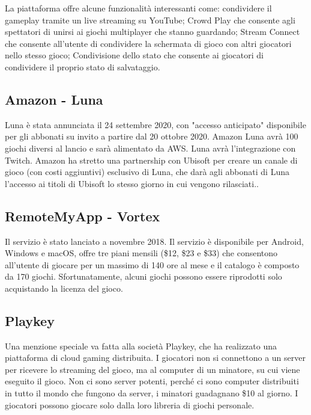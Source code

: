 La piattaforma offre alcune funzionalità interessanti come: condividere il gameplay tramite un live streaming su YouTube; Crowd Play che consente agli spettatori di unirsi ai giochi multiplayer che stanno guardando; Stream Connect che consente all'utente di condividere la schermata di gioco con altri giocatori nello stesso gioco; Condivisione dello stato che consente ai giocatori di condividere il proprio stato di salvataggio\cite{Google_Stadia}.

\subsection{Amazon - Luna}
Luna è stata annunciata il 24 settembre 2020, con "accesso anticipato" disponibile per gli abbonati su invito a partire dal 20 ottobre 2020. Amazon Luna avrà 100 giochi diversi al lancio e sarà alimentato da AWS. Luna avrà l'integrazione con Twitch. Amazon ha stretto una partnership con Ubisoft per creare un canale di gioco (con costi aggiuntivi) esclusivo di Luna, che darà agli abbonati di Luna l'accesso ai titoli di Ubisoft lo stesso giorno in cui vengono rilasciati.\cite{Amazon_Luna}.

\subsection{RemoteMyApp - Vortex}
Il servizio è stato lanciato a novembre 2018. Il servizio è disponibile per Android, Windows e macOS, offre tre piani mensili (\$12, \$23 e \$33) che consentono all'utente di giocare per un massimo di 140 ore al mese e il catalogo è composto da 170 giochi. Sfortunatamente, alcuni giochi possono essere riprodotti solo acquistando la licenza del gioco\cite{RemoteMyApp_Vortex}.

\subsection{Playkey}
Una menzione speciale va fatta alla società Playkey, che ha realizzato una piattaforma di cloud gaming distribuita. I giocatori non si connettono a un server per ricevere lo streaming del gioco, ma al computer di un minatore, su cui viene eseguito il gioco. Non ci sono server potenti, perché ci sono computer distribuiti in tutto il mondo che fungono da server, i minatori guadagnano \$10 al giorno. I giocatori possono giocare solo dalla loro libreria di giochi personale\cite{Playkey}.